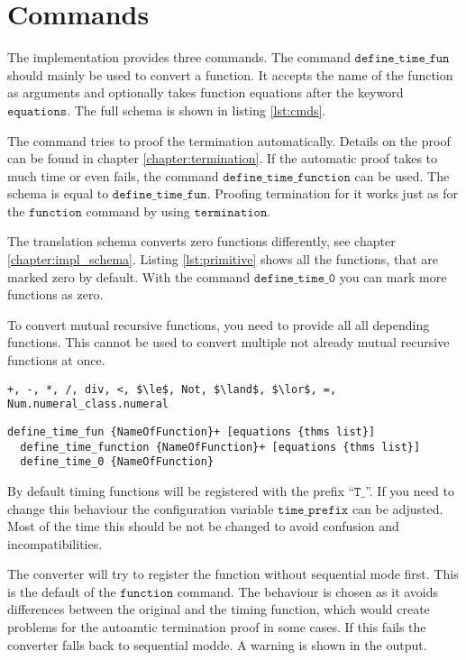 

\section{Commands}\label{chapter:commands}

The implementation provides three commands.
The command $\texttt{define\_time\_fun}$ should mainly be used to convert a function.
It accepts the name of the function as arguments and optionally takes function equations after the keyword $\texttt{equations}$.
The full schema is shown in listing \ref{lst:cmds}.

The command tries to proof the termination automatically.
Details on the proof can be found in chapter \ref{chapter:termination}.
If the automatic proof takes to much time or even fails, the command $\texttt{define\_time\_function}$ can be used.
The schema is equal to $\texttt{define\_time\_fun}$.
Proofing termination for it works just as for the $\texttt{function}$ command by using $\texttt{termination}$.

The translation schema converts zero functions differently, see chapter \ref{chapter:impl_schema}.
Listing \ref{lst:primitive} shows all the functions, that are marked zero by default.
With the command $\texttt{define\_time\_0}$ you can mark more functions as zero.

To convert mutual recursive functions, you need to provide all all depending functions.
This cannot be used to convert multiple not already mutual recursive functions at once.

\begin{lstlisting}[float,label=lst:primitive,caption=Functions primitive by default,mathescape=true]
  +, -, *, /, div, <, $\le$, Not, $\land$, $\lor$, =, Num.numeral_class.numeral
\end{lstlisting}

\begin{lstlisting}[float,label=lst:cmds,caption=Schema of implemented command]
  define_time_fun {NameOfFunction}+ [equations {thms list}]
  define_time_function {NameOfFunction}+ [equations {thms list}]
  define_time_0 {NameOfFunction}
\end{lstlisting}

By default timing functions will be registered with the prefix ``$\texttt{T\_}$''.
If you need to change this behaviour the configuration variable $\texttt{time\_prefix}$ can be adjusted.
Most of the time this should be not be changed to avoid confusion and incompatibilities.

The converter will try to register the function without sequential mode first.
This is the default of the $\texttt{function}$ command.
The behaviour is chosen as it avoids differences between the original and the timing function,
which would create problems for the autoamtic termination proof in some cases.
If this fails the converter falls back to sequential modde.
A warning is shown in the output.
